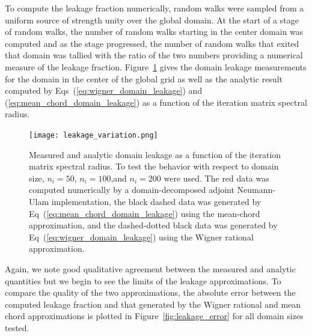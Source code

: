\documentclass[preprint,11pt]{elsarticle}
\begin{document}
To compute the leakage fraction numerically,  random walks were
sampled from a uniform source of strength unity over the global domain. At the
start of a stage of random walks, the number of random walks starting in the
center domain was computed and as the stage progressed, the number of random
walks that exited that domain was tallied with the ratio of the two numbers
providing a numerical measure of the leakage
fraction. Figure~\ref{fig:measured_leakage} gives the domain leakage
measurements for the domain in the center of the global grid as well as the
analytic result computed by Eqs~(\ref{eq:wigner_domain_leakage}) and
(\ref{eq:mean_chord_domain_leakage}) as a function of the iteration matrix
spectral radius.
\begin{figure}[ht!]
  \begin{center}
    \texttt{[image: leakage\_variation.png]}
  \end{center}
  \caption{Measured and analytic domain leakage as a function of the iteration
    matrix spectral radius. To test the behavior with respect to domain size,
    $n_i=50$, $n_i=100$,and $n_i=200$ were used. The red data was computed
    numerically by a domain-decomposed adjoint Neumann-Ulam implementation,
    the black dashed data was generated by
    Eq~(\ref{eq:mean_chord_domain_leakage}) using the mean-chord
    approximation, and the dashed-dotted black data was generated by
    Eq~(\ref{eq:wigner_domain_leakage}) using the Wigner rational
    approximation.}
  \label{fig:measured_leakage}
\end{figure}
Again, we note good qualitative agreement between the measured and
analytic quantities but we begin to see the limits of the leakage
approximations. To compare the quality of the two approximations, the
absolute error between the computed leakage fraction and that
generated by the Wigner rational and mean chord approximations is
plotted in Figure~\ref{fig:leakage_error} for all domain sizes
tested. 
\end{document}
